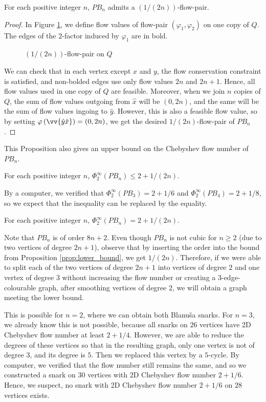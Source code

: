 \begin{proposition}
For each positive integer $n$, $PB_n$ admits a $(1/(2n))$-flow-pair.
\end{proposition}
\begin{proof}
In Figure \ref{fig:Q_flow}, we define flow values of flow-pair $(\varphi_1, \varphi_2)$ on one copy of $Q$. The edges of the $2$-factor induced by $\varphi_1$ are in bold.
\begin{figure}[h!]
\centering

\caption{$(1/(2n))$-flow-pair on $Q$}
\label{fig:Q_flow}
\end{figure}
We can check that in each vertex except $x$ and $y$, the flow conservation constraint is satisfied, and non-bolded edges use only flow values $2n$ and $2n+1$. Hence, all flow values used in one copy of $Q$ are feasible. Moreover, when we join $n$ copies of $Q$, the sum of flow values outgoing from $\hat{x}$ will be $(0, 2n)$, and the same will be the sum of flow values ingoing to $\hat{y}$. However, this is also a feasible flow value, so by setting $\varphi\left(\vv{\hat{y}\hat{x}}\right) = (0, 2n)$, we get the desired $1/(2n)$-flow-pair of $PB_n$.
\end{proof}

This Proposition also gives an upper bound on the Chebyshev flow number of $PB_n$.
\begin{corollary}
For each positive integer $n$, $\Phi_2^\infty(PB_n)\leq 2+1/(2n)$.
\end{corollary}

By a computer, we verified that $\Phi_2^\infty(PB_3)=2+1/6$ and $\Phi_2^\infty(PB_4)=2+1/8$, so we expect that the inequality can be replaced by the equality.

\begin{conjecture}
For each positive integer $n$, $\Phi_2^\infty(PB_n) = 2+1/(2n)$.
\end{conjecture}

Note that $PB_n$ is of order $8n+2$. Even though $PB_n$ is not cubic for $n\geq 2$ (due to two vertices of degree $2n+1$), observe that by inserting the order into the bound from Proposition \ref{prop:lower_bound}, we get $1/(2n)$. Therefore, if we were able to split each of the two vertices of degree $2n+1$ into vertices of degree $2$ and one vertex of degree $3$ without increasing the flow number or creating a $3$-edge-colourable graph, after smoothing vertices of degree $2$, we will obtain a graph meeting the lower bound.

This is possible for $n=2$, where we can obtain both Blanuša snarks. For $n=3$, we already know this is not possible, because all snarks on $26$ vertices have 2D Chebyshev flow number at least $2+1/4$. However, we are able to reduce the degrees of these vertices so that in the resulting graph, only one vertex is not of degree $3$, and its degree is $5$. Then we replaced this vertex by a $5$-cycle. By computer, we verified that the flow number still remains the same, and so we constructed a snark on $30$ vertices with 2D Chebyshev flow number $2+1/6$. Hence, we suspect, no snark with 2D Chebyshev flow number $2+1/6$ on $28$ vertices exists.

